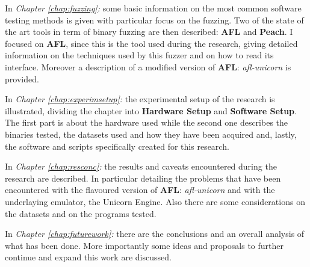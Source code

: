 \documentclass[../main.tex]{subfiles}
\begin{document}
\bigskip \noindent
In \textit{Chapter \ref{chap:fuzzing}: } some basic information on the most common software testing methods is given with particular focus on the fuzzing. Two of the state of the art tools in term of binary fuzzing are then described: \textbf{AFL} and \textbf{Peach}. I focused on \textbf{AFL}, since this is the tool used during the research, giving detailed information on the techniques used by this fuzzer and on how to read its interface. Moreover a description of a modified version of \textbf{AFL}: \textit{afl-unicorn} is provided.

\bigskip \noindent
In \textit{Chapter \ref{chap:experimsetup}: } the experimental setup of the research is illustrated, dividing the chapter into \textbf{Hardware Setup} and \textbf{Software Setup}. The first part is about the hardware used while the second one describes the binaries tested, the datasets used and how they have been acquired and, lastly, the software and scripts specifically created for this research.

\bigskip \noindent
In \textit{Chapter \ref{chap:resconc}: } the results and caveats encountered during the research are described. In particular detailing the problems that have been encountered with the flavoured version of \textbf{AFL}: \textit{afl-unicorn} and with the underlaying emulator, the Unicorn Engine. Also there are some considerations on the datasets and on the programs tested.

\bigskip \noindent
In \textit{Chapter \ref{chap:futurework}: } there are the conclusions and an overall analysis of what has been done. More importantly some ideas and proposals to further continue and expand this work are discussed.
\newline
\end{document}
